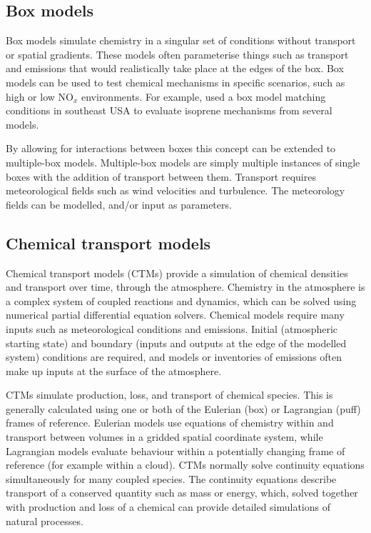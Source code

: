   

  \subsection{Box models}
    
    Box models simulate chemistry in a singular set of conditions without transport or spatial gradients.
    These models often parameterise things such as transport and emissions that would realistically take place at the edges of the box.
    Box models can be used to test chemical mechanisms in specific scenarios, such as high or low NO$_x$ environments.
    For example, \textcite{Marvin2017} used a box model matching conditions in southeast USA to evaluate isoprene mechanisms from several models.  
    
    By allowing for interactions between boxes this concept can be extended to multiple-box models.
    Multiple-box models are simply multiple instances of single boxes with the addition of transport between them.
    Transport requires meteorological fields such as wind velocities and turbulence.
    The meteorology fields can be modelled, and/or input as parameters.
  
  
  \subsection{Chemical transport models}
    \label{LR:Models:ctm}
    Chemical transport models (CTMs) provide a simulation of chemical densities and transport over time, through the atmosphere.
    Chemistry in the atmosphere is a complex system of coupled reactions and dynamics, which can be solved using numerical partial differential equation solvers.
    Chemical models require many inputs such as meteorological conditions and emissions.
    Initial (atmospheric starting state) and boundary (inputs and outputs at the edge of the modelled system) conditions are required, and models or inventories of emissions often make up inputs at the surface of the atmosphere.
    
    
    CTMs simulate production, loss, and transport of chemical species.
    This is generally calculated using one or both of the Eulerian (box) or Lagrangian (puff) frames of reference.
    Eulerian models use equations of chemistry within and transport between volumes in a gridded spatial coordinate system, while Lagrangian models evaluate behaviour within a potentially changing frame of reference (for example within a cloud).
    CTMs normally solve continuity equations simultaneously for many coupled species.
    The continuity equations describe transport of a conserved quantity such as mass or energy, which, solved together with production and loss of a chemical can provide detailed simulations of natural processes.
    
